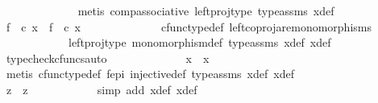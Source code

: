 \begin{isabellebody}
\ \ \ \ \ \ \ \ \ \ \ \ \isamarkupfalse%
\ {\isacharparenleft}{\kern0pt}metis\ comp{\isacharunderscore}{\kern0pt}associative{}\ left{\isacharunderscore}{\kern0pt}proj{\isacharunderscore}{\kern0pt}type\ type{\isacharunderscore}{\kern0pt}assms{\isacharparenleft}{\kern0pt}{}{\isacharparenright}{\kern0pt}\ x{}{\isacharunderscore}{\kern0pt}def{\isacharparenright}{\kern0pt}\isanewline
\ \ \ \ \ \ \ \ \ \ \isamarkupfalse%
\ \isamarkupfalse%
\ {\isachardoublequoteopen}f\ \ {\isasymcirc}\isactrlsub c\ x{}\ {\isacharequal}{\kern0pt}\ f\ \ {\isasymcirc}\isactrlsub c\ x{}{\isachardoublequoteclose}\isanewline
\ \ \ \ \ \ \ \ \ \ \ \ \isamarkupfalse%
\ cfunc{\isacharunderscore}{\kern0pt}type{\isacharunderscore}{\kern0pt}def\ left{\isacharunderscore}{\kern0pt}coproj{\isacharunderscore}{\kern0pt}are{\isacharunderscore}{\kern0pt}monomorphisms\isanewline
\ \ \ \ \ \ \ \ \ \ \ \ left{\isacharunderscore}{\kern0pt}proj{\isacharunderscore}{\kern0pt}type\ monomorphism{\isacharunderscore}{\kern0pt}def\ type{\isacharunderscore}{\kern0pt}assms{\isacharparenleft}{\kern0pt}{}{\isacharparenright}{\kern0pt}\ x{}{\isacharunderscore}{\kern0pt}def\ x{}{\isacharunderscore}{\kern0pt}def\ \isamarkupfalse%
\ {\isacharparenleft}{\kern0pt}typecheck{\isacharunderscore}{\kern0pt}cfuncs{\isacharcomma}{\kern0pt}auto{\isacharparenright}{\kern0pt}\isanewline
\ \ \ \ \ \ \ \ \ \ \isamarkupfalse%
\ \isamarkupfalse%
\ {\isachardoublequoteopen}x{}\ {\isacharequal}{\kern0pt}\ x{}{\isachardoublequoteclose}\isanewline
\ \ \ \ \ \ \ \ \ \ \ \ \isamarkupfalse%
\ {\isacharparenleft}{\kern0pt}metis\ cfunc{\isacharunderscore}{\kern0pt}type{\isacharunderscore}{\kern0pt}def\ f{\isacharunderscore}{\kern0pt}epi\ injective{\isacharunderscore}{\kern0pt}def\ type{\isacharunderscore}{\kern0pt}assms{\isacharparenleft}{\kern0pt}{}{\isacharparenright}{\kern0pt}\ x{}{\isacharunderscore}{\kern0pt}def\ x{}{\isacharunderscore}{\kern0pt}def{\isacharparenright}{\kern0pt}\isanewline
\ \ \ \ \ \ \ \ \isamarkupfalse%
\isanewline
\ \ \ \ \ \ \ \ \isamarkupfalse%
\ \isamarkupfalse%
\ {\isachardoublequoteopen}z{}\ {\isacharequal}{\kern0pt}\ z{}{\isachardoublequoteclose}\isanewline
\ \ \ \ \ \ \ \ \ \ \isamarkupfalse%
\ {\isacharparenleft}{\kern0pt}simp\ add{\isacharcolon}{\kern0pt}\ x{}{\isacharunderscore}{\kern0pt}def\ x{}{\isacharunderscore}{\kern0pt}def{\isacharparenright}{\kern0pt}\isanewline

\end{isabellebody}
